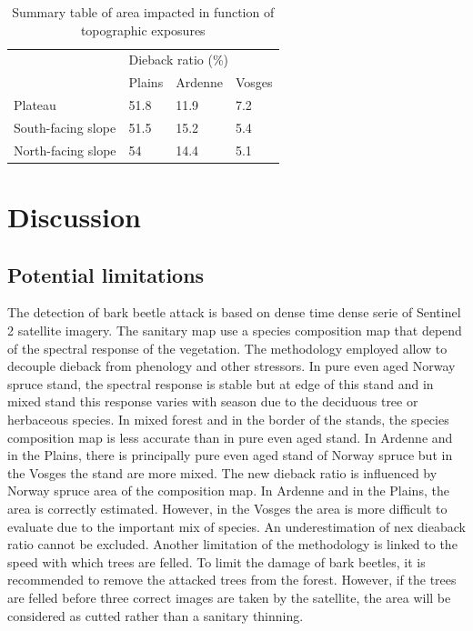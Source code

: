 \documentclass[3p,procedia]{elsarticle}
\begin{document}
\begin{table}[htbp] 
\caption{Summary table of area impacted in function of topographic exposures}
\label{tab_or_topo}

\begin{tabular}{|l|lll|}
\hline
\multirow{2}{*}{}  & \multicolumn{3}{l|}{Dieback ratio (\%)}                             \\ \cline{2-4} 
                   & \multicolumn{1}{l|}{Plains} & \multicolumn{1}{l|}{Ardenne} & Vosges \\ \hline
Plateau            & \multicolumn{1}{l|}{51.8}   & \multicolumn{1}{l|}{11.9}    & 7.2    \\ \hline
South-facing slope & \multicolumn{1}{l|}{51.5}   & \multicolumn{1}{l|}{15.2}    & 5.4    \\ \hline
North-facing slope & \multicolumn{1}{l|}{54}   & \multicolumn{1}{l|}{14.4}    & 5.1   \\ \hline
\end{tabular}
\end{table}

   

\section{Discussion}

\subsection{Potential limitations}
The detection of bark beetle attack is based on dense time dense serie of Sentinel 2 satellite imagery. 
The sanitary map use a species composition map that depend of the spectral response of the vegetation.
The methodology employed allow to decouple dieback from phenology and other stressors.
In pure even aged Norway spruce stand, the spectral response is stable but at edge of this stand and in mixed stand this response varies with season due to the deciduous tree or herbaceous species.
In mixed forest and in the border of the stands, the species composition map is less accurate than in pure even aged stand.
In Ardenne and in the Plains, there is principally pure even aged stand of Norway spruce but in the Vosges the stand are more mixed.
The new dieback ratio is influenced by Norway spruce area of the composition map.
In Ardenne and in the Plains, the area is correctly estimated.
However, in the Vosges the area is more difficult to evaluate due to the important mix of species.
An underestimation of nex dieaback ratio cannot be excluded.
Another limitation of the methodology is linked to the speed with which trees are felled.
To limit the damage of bark beetles, it is recommended to remove the attacked trees from the forest.
However, if the trees are felled before three correct images are taken by the satellite, the area will be considered as cutted rather than a sanitary thinning.  
 
\end{document}
